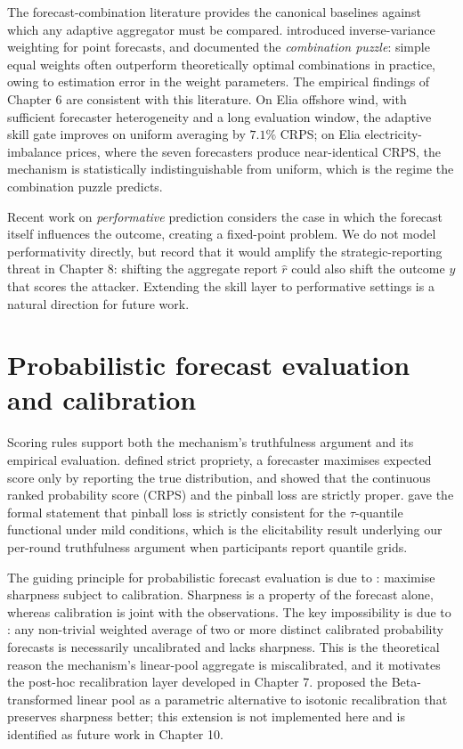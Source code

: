 \documentclass[
  11pt,
  a4paper,
  oneside]{report}
\begin{document}
The forecast-combination literature provides the canonical baselines
against which any adaptive aggregator must be compared.
\citet{bates1969combination} introduced inverse-variance weighting for
point forecasts, and \citet{timmermann2006forecast} documented the
\emph{combination puzzle}: simple equal weights often outperform
theoretically optimal combinations in practice, owing to estimation
error in the weight parameters. The empirical findings of Chapter 6 are
consistent with this literature. On Elia offshore wind, with sufficient
forecaster heterogeneity and a long evaluation window, the adaptive
skill gate improves on uniform averaging by \(7.1\%\) CRPS; on Elia
electricity-imbalance prices, where the seven forecasters produce
near-identical CRPS, the mechanism is statistically indistinguishable
from uniform, which is the regime the combination puzzle predicts.

Recent work on \emph{performative} prediction
\citep{hardt2023performative, oesterheld2023performative} considers the
case in which the forecast itself influences the outcome, creating a
fixed-point problem. We do not model performativity directly, but record
that it would amplify the strategic-reporting threat in Chapter 8:
shifting the aggregate report \(\hat r\) could also shift the outcome
\(y\) that scores the attacker. Extending the skill layer to
performative settings is a natural direction for future work.

\section{Probabilistic forecast evaluation and
calibration}\label{probabilistic-forecast-evaluation-and-calibration}

Scoring rules support both the mechanism's truthfulness argument and its
empirical evaluation. \citet{gneiting2007strictly} defined strict
propriety, a forecaster maximises expected score only by reporting the
true distribution, and showed that the continuous ranked probability
score (CRPS) and the pinball loss are strictly proper.
\citet{steinwart2011estimating} gave the formal statement that pinball
loss is strictly consistent for the \(\tau\)-quantile functional under
mild conditions, which is the elicitability result underlying our
per-round truthfulness argument when participants report quantile grids.

The guiding principle for probabilistic forecast evaluation is due to
\citet{gneiting2007probabilistic}: maximise sharpness subject to
calibration. Sharpness is a property of the forecast alone, whereas
calibration is joint with the observations. The key impossibility is due
to \citet{ranjan2010combining}: any non-trivial weighted average of two
or more distinct calibrated probability forecasts is necessarily
uncalibrated and lacks sharpness. This is the theoretical reason the
mechanism's linear-pool aggregate is miscalibrated, and it motivates the
post-hoc recalibration layer developed in Chapter 7.
\citet{gneiting2013combining} proposed the Beta-transformed linear pool
as a parametric alternative to isotonic recalibration that preserves
sharpness better; this extension is not implemented here and is
identified as future work in Chapter 10.
\end{document}

